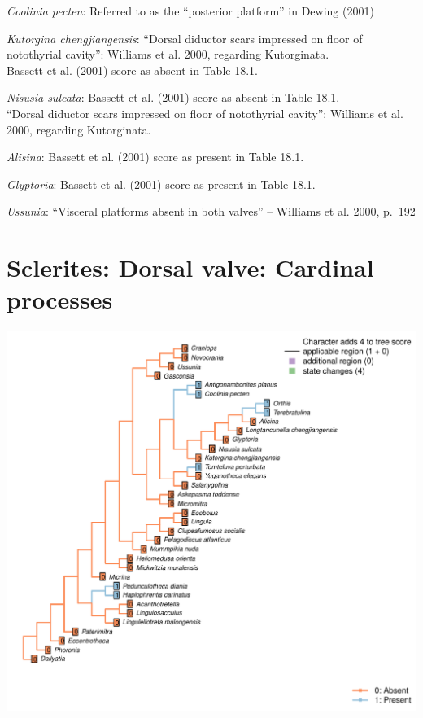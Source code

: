 \documentclass[]{book}
\theoremstyle{definition}
\theoremstyle{definition}
\theoremstyle{definition}
\theoremstyle{remark}
\begin{document}
\emph{Coolinia pecten}: Referred to as the ``posterior platform'' in
Dewing (2001)

\emph{Kutorgina chengjiangensis}: ``Dorsal diductor scars impressed on
floor of notothyrial cavity'': Williams et al. 2000, regarding
Kutorginata.\\
Bassett et al. (2001) score as absent in Table 18.1.

\emph{Nisusia sulcata}: Bassett et al. (2001) score as absent in Table
18.1.\\
``Dorsal diductor scars impressed on floor of notothyrial cavity'':
Williams et al. 2000, regarding Kutorginata.

\emph{Alisina}: Bassett et al. (2001) score as present in Table 18.1.

\emph{Glyptoria}: Bassett et al. (2001) score as present in Table 18.1.

\emph{Ussunia}: ``Visceral platforms absent in both valves'' -- Williams
et al. 2000, p.~192

\hypertarget{sclerites-dorsal-valve-cardinal-processes}{%
\section*{Sclerites: Dorsal valve: Cardinal
processes}\label{sclerites-dorsal-valve-cardinal-processes}}

\includegraphics{Brachiopod_phylogeny_files/figure-latex/unnamed-chunk-5-27.pdf}
\end{document}
